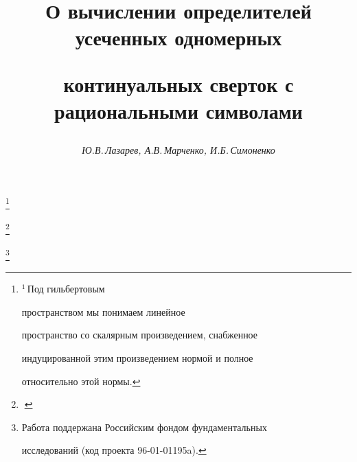 

 




\newcommand{\Hom}{\operatorname{Hom}} 


\newcommand{\End}{\operatorname{End}} 


\newcommand{\tts}[1]{} 


 




  


\setcounter{page}{77} 












 


\author{\it Ю.В.\,Лазарев, А.В.\,Марченко, И.Б.\,Симоненко} 




\title{О вычислении определителей усеченных одномерных 


континуальных сверток с рациональными символами} 


\thanks{${}^1$\,Под гильбертовым 


пространством мы понимаем линейное 


пространство со скалярным произведением, снабженное 


индуцированной этим произведением нормой и полное 


относительно этой нормы.}


\thanks{$\phantom{.}$}


\thanks{Работа поддержана Российским фондом фундаментальных 


исследований (код проекта 96-01-01195a).} 


